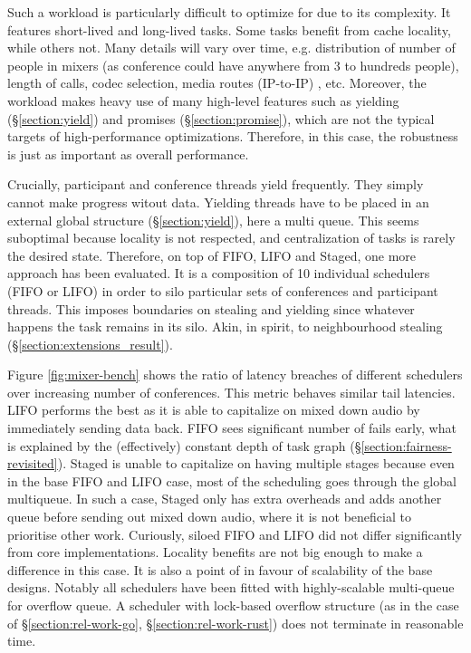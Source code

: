 \documentclass[12pt,a4paper,twoside]{report}
\begin{document}
Such a workload is particularly difficult to optimize for due to its complexity. It features short-lived and long-lived tasks. Some tasks benefit from cache locality, while others not. Many details will vary over time, e.g. distribution of number of people in mixers (as conference could have anywhere from 3 to hundreds people), length of calls, codec selection, media routes (IP-to-IP) \cite{Frequent1:online}, etc. Moreover, the workload makes heavy use of many high-level features such as yielding (\S\ref{section:yield}) and promises (\S\ref{section:promise}), which are not the typical targets of high-performance optimizations. Therefore, in this case, the robustness is just as important as overall performance. 
 
Crucially, participant and conference threads yield frequently. They simply cannot make progress witout data. Yielding threads have to be placed in an external global structure (\S\ref{section:yield}), here a multi queue. This seems suboptimal because locality is not respected, and centralization of tasks is rarely the desired state. Therefore, on top of FIFO, LIFO and Staged, one more approach has been evaluated. It is a composition of 10 individual schedulers (FIFO or LIFO) in order to silo particular sets of conferences and participant threads. This imposes boundaries on stealing and yielding since whatever happens the task remains in its silo. Akin, in spirit, to neighbourhood stealing (\S\ref{section:extensions_result}).

\label{paragraph:overflow-queue-bad-2}

Figure \ref{fig:mixer-bench} shows the ratio of latency breaches of different schedulers over increasing number of conferences. This metric behaves similar tail latencies. LIFO performs the best as it is able to capitalize on mixed down audio by immediately sending data back. FIFO sees significant number of fails early, what is explained by the (effectively) constant depth of task graph (\S\ref{section:fairness-revisited}). Staged is unable to capitalize on having multiple stages because even in the base FIFO and LIFO case, most of the scheduling goes through the global multiqueue. In such a case, Staged only has extra overheads and adds another queue before sending out mixed down audio, where it is not beneficial to prioritise other work. Curiously, siloed FIFO and LIFO did not differ significantly from core implementations. Locality benefits are not big enough to make a difference in this case. It is also a point of in favour of scalability of the base designs. Notably all schedulers have been fitted with highly-scalable multi-queue for overflow queue. A scheduler with lock-based overflow structure (as in the case of \S\ref{section:rel-work-go}, \S\ref{section:rel-work-rust}) does not terminate in reasonable time.
\end{document}
